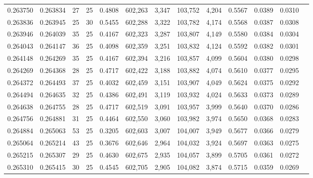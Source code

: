 \begin{tabular}{rrrrrrrrrrrrr}
0.263750 & 0.263834 &    27 &  25 &                                     0.4808 & 602,263 &   3,347 & 103,752 &   4,204 & 0.5567 & 0.0389 & 0.0310 \\
0.263836 & 0.263945 &    25 &  30 &                                     0.5455 & 602,288 &   3,322 & 103,782 &   4,174 & 0.5568 & 0.0387 & 0.0308 \\
0.263946 & 0.264039 &    35 &  25 &                                     0.4167 & 602,323 &   3,287 & 103,807 &   4,149 & 0.5580 & 0.0384 & 0.0304 \\
0.264043 & 0.264147 &    36 &  25 &                                     0.4098 & 602,359 &   3,251 & 103,832 &   4,124 & 0.5592 & 0.0382 & 0.0301 \\
0.264148 & 0.264269 &    35 &  25 &                                     0.4167 & 602,394 &   3,216 & 103,857 &   4,099 & 0.5604 & 0.0380 & 0.0298 \\
0.264269 & 0.264368 &    28 &  25 &                                     0.4717 & 602,422 &   3,188 & 103,882 &   4,074 & 0.5610 & 0.0377 & 0.0295 \\
0.264372 & 0.264493 &    37 &  25 &                                     0.4032 & 602,459 &   3,151 & 103,907 &   4,049 & 0.5624 & 0.0375 & 0.0292 \\
0.264494 & 0.264635 &    32 &  25 &                                     0.4386 & 602,491 &   3,119 & 103,932 &   4,024 & 0.5633 & 0.0373 & 0.0289 \\
0.264638 & 0.264755 &    28 &  25 &                                     0.4717 & 602,519 &   3,091 & 103,957 &   3,999 & 0.5640 & 0.0370 & 0.0286 \\
0.264756 & 0.264881 &    31 &  25 &                                     0.4464 & 602,550 &   3,060 & 103,982 &   3,974 & 0.5650 & 0.0368 & 0.0283 \\
0.264884 & 0.265063 &    53 &  25 &                                     0.3205 & 602,603 &   3,007 & 104,007 &   3,949 & 0.5677 & 0.0366 & 0.0279 \\
0.265064 & 0.265214 &    43 &  25 &                                     0.3676 & 602,646 &   2,964 & 104,032 &   3,924 & 0.5697 & 0.0363 & 0.0275 \\
0.265215 & 0.265307 &    29 &  25 &                                     0.4630 & 602,675 &   2,935 & 104,057 &   3,899 & 0.5705 & 0.0361 & 0.0272 \\
0.265310 & 0.265415 &    30 &  25 &                                     0.4545 & 602,705 &   2,905 & 104,082 &   3,874 & 0.5715 & 0.0359 & 0.0269 \\

\end{tabular}
